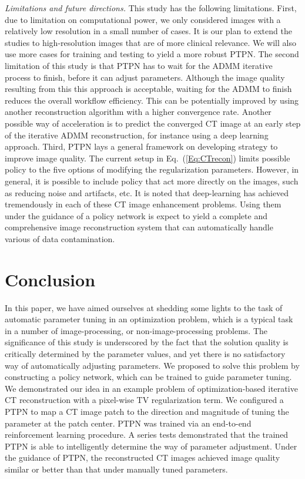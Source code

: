 \documentclass[journal]{IEEEtran}
\begin{document}
\emph{Limitations and future directions.} This study has the following limitations. First, due to limitation on computational power, we only considered images with a relatively low resolution in a small number of cases. It is our plan to extend the studies to high-resolution images that are of more clinical relevance. We will also use more cases for training and testing to yield a more robust PTPN. The second limitation of this study is that PTPN has to wait for the ADMM iterative process to finish, before it can adjust parameters. Although the image quality resulting from this this approach is acceptable, waiting for the ADMM to finish reduces the overall workflow efficiency. This can be potentially improved by using another reconstruction algorithm with a higher convergence rate. Another possible way of acceleration is to predict the converged CT image at an early step of the iterative ADMM reconstruction, for instance using a deep learning approach\cite{Cheng:Fully3d:2017}. Third, PTPN lays a general framework on developing strategy to improve image quality. The current setup in Eq.~(\ref{Eq:CTrecon}) limits possible policy to the five options of modifying the regularization parameters. However, in general, it is possible to include policy that act more directly on the images, such as reducing noise and artifacts, etc. It is noted that deep-learning has achieved tremendously in each of these CT image enhancement problems\cite{Han:CoRR:2016,Kang:CoRR:2016,Li:Fully3d:2017}. Using them under the guidance of a policy network is expect to yield a complete and comprehensive image reconstruction system that can automatically handle various of data contamination. 

\section{Conclusion}

In this paper, we have aimed ourselves at shedding some lights to the task of automatic parameter tuning in an optimization problem, which is a typical task in a number of image-processing, or non-image-processing problems. The significance of this study is underscored by the fact that the solution quality is critically determined by the parameter values, and yet there is no satisfactory way of automatically adjusting parameters. We proposed to solve this problem by constructing a policy network, which can be trained to guide parameter tuning. We demonstrated our idea in an example problem of optimization-based iterative CT reconstruction with a pixel-wise TV regularization term. We configured a PTPN to map a CT image patch to the direction and magnitude of tuning the parameter at the patch center. PTPN was trained via an end-to-end reinforcement learning procedure. A series tests demonstrated that the trained PTPN is able to intelligently determine the way of parameter adjustment. Under the guidance of PTPN, the reconstructed CT images achieved image quality similar or better than that under manually tuned parameters. 
\end{document}
